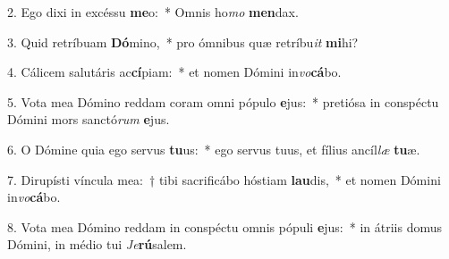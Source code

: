 \item 2. Ego dixi in excéssu \textbf{me}o:~* Omnis ho\textit{mo} \textbf{men}dax.
\item 3. Quid retríbuam \textbf{Dó}mino,~* pro ómnibus quæ retríbu\hspace{0.03em}\textit{it} \textbf{mi}hi?
\item 4. Cálicem salutáris ac\textbf{cí}piam:~* et nomen Dómini in\textit{vo}\textbf{cá}bo.
\item 5. Vota mea Dómino reddam coram omni pópulo \textbf{e}jus:~* pretiósa in conspé\-ctu Dómini mors sanctó\textit{rum} \textbf{e}jus.
\item 6. O Dómine quia ego servus \textbf{tu}us:~* ego servus tuus, et fílius ancíl\textit{læ} \textbf{tu}æ.
\item 7. Dirupísti víncula mea:~† tibi sacrificábo hóstiam \textbf{lau}dis,~* et nomen Dómini in\textit{vo}\textbf{cá}bo.
\item 8. Vota mea Dómino reddam in conspéctu omnis pópuli \textbf{e}jus:~* in átriis domus Dómini, in médio tui \hspace{0.03em}\textit{Je}\textbf{rú}salem.
